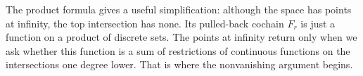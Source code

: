 The product formula gives a useful simplification: although the space
has points at infinity, the top intersection has none. Its pulled-back
cochain \(F_r\) is just a function on a product of discrete sets.
The points at infinity return only when we ask whether this function
is a sum of restrictions of continuous functions on the intersections
one degree lower.
That is where the nonvanishing argument begins.
